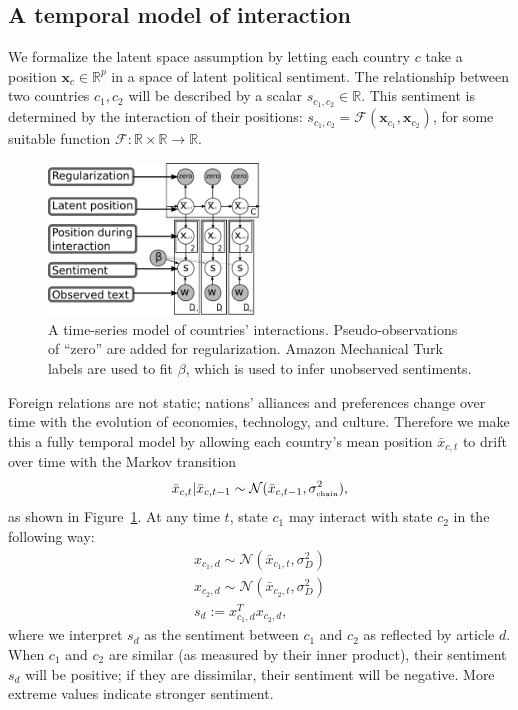\subsection{A temporal model of interaction}
We formalize the latent space assumption by letting each country $c$
take a position $\bm x_c \in \mathbb{R}^p$ in a space of latent
political sentiment. The relationship between two countries $c_1, c_2$
will be described by a scalar $s_{c_1,c_2} \in \mathbb{R}$.  This
sentiment is determined by the interaction of their positions:
$s_{c_1, c_2} = \mathcal{F}(\bm x_{c_1}, \bm x_{c_2})$, for some
suitable function $\mathcal{F}: \mathbb{R} \times \mathbb{R}
\rightarrow \mathbb{R}$.

\begin{figure}
  \center
  \vspace{-55pt}
  \includegraphics[width=0.5\textwidth]{chapter_foreign_relations/figures/countries_gm.pdf}
  \caption{A time-series model of countries' interactions.
    Pseudo-observations of ``zero'' are added for regularization.
    Amazon Mechanical Turk labels are used to fit $\beta$, which is
    used to infer unobserved sentiments.}
  \label{fig:fa_gm}
\end{figure}

Foreign relations are not static; nations' alliances and preferences
change over time with the evolution of economies, technology, and
culture.  Therefore we make this a fully temporal model by
allowing each country's mean position $\bar x_{c,t}$ to drift over
time with the Markov transition
\begin{align}
  \bar x_{c,t} | \bar x_{c,t-1} \sim \mathcal{N}(\bar x_{c,t-1}, \sigma_{\mbox{\tiny chain}}^2),
\end{align}
as shown in Figure~\ref{fig:fa_gm}. At any time $t$, state $c_1$ may interact with state $c_2$ in the following way:
\begin{align}
  x_{c_1,d} \sim \mathcal{N}(\bar x_{c_1, t}, \sigma_D^2) \nonumber \\
  x_{c_2,d} \sim \mathcal{N}(\bar x_{c_2, t}, \sigma_D^2) \nonumber \\
  s_d := x_{c_1,d}^T x_{c_2,d}, \label{eq:sentiment_space}
\end{align}
where we interpret $s_d$ as the sentiment between $c_1$ and $c_2$ as
reflected by article $d$.  When $c_1$ and $c_2$ are similar (as
measured by their inner product), their sentiment $s_d$ will be
positive; if they are dissimilar, their sentiment will be negative.
More extreme values indicate stronger sentiment.

